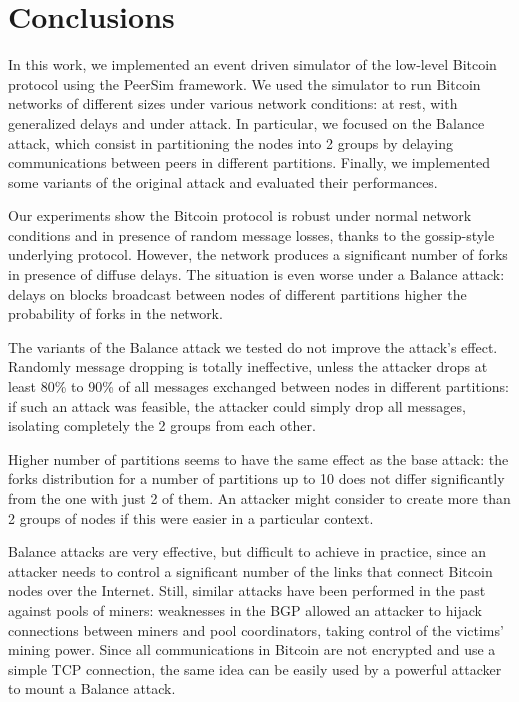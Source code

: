 \chapter{Conclusions}
\label{chapter:conclusions}
In this work, we implemented an event driven simulator of the low-level Bitcoin protocol using the PeerSim framework.
We used the simulator to run Bitcoin networks of different sizes under various network conditions: at rest, with generalized delays and under attack.
In particular, we focused on the Balance attack, which consist in partitioning the nodes into \num{2} groups by delaying communications between peers in different partitions.
Finally, we implemented some variants of the original attack and evaluated their performances.

Our experiments show the Bitcoin protocol is robust under normal network conditions and in presence of random message losses, thanks to the gossip-style underlying protocol.
However, the network produces a significant number of forks in presence of diffuse delays.
The situation is even worse under a Balance attack:
delays on blocks broadcast between nodes of different partitions higher the probability of forks in the network.

The variants of the Balance attack we tested do not improve the attack's effect.
Randomly message dropping is totally ineffective, unless the attacker drops at least \num{80}\% to \num{90}\% of all messages exchanged between nodes in different partitions:
if such an attack was feasible, the attacker could simply drop all messages, isolating completely the \num{2} groups from each other.

Higher number of partitions seems to have the same effect as the base attack:
the forks distribution for a number of partitions up to \num{10} does not differ significantly from the one with just \num{2} of them.
An attacker might consider to create more than \num{2} groups of nodes if this were easier in a particular context.

Balance attacks are very effective, but difficult to achieve in practice, since an attacker needs to control a significant number of the links that connect Bitcoin nodes over the Internet.
Still, similar attacks have been performed in the past against pools of miners:
weaknesses in the \ac{BGP} allowed an attacker to hijack connections between miners and pool coordinators, taking control of the victims' mining power.
Since all communications in Bitcoin are not encrypted and use a simple TCP connection, the same idea can be easily used by a powerful attacker to mount a Balance attack.


